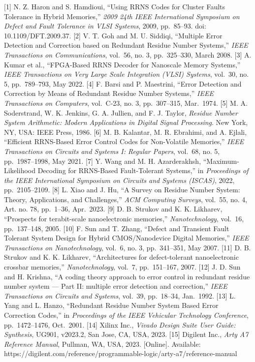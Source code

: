 {[}1{]} N. Z. Haron and S. Hamdioui, ``Using RRNS Codes for Cluster
Faults Tolerance in Hybrid Memories,'' \emph{2009 24th IEEE
International Symposium on Defect and Fault Tolerance in VLSI Systems},
2009, pp.~85--93. doi: 10.1109/DFT.2009.37. {[}2{]} V. T. Goh and M. U.
Siddiqi, ``Multiple Error Detection and Correction based on Redundant
Residue Number Systems,'' \emph{IEEE Transactions on Communications},
vol.~56, no. 3, pp.~325--330, March 2008. {[}3{]} A. Kumar et al.,
``FPGA-Based RRNS Decoder for Nanoscale Memory Systems,'' \emph{IEEE
Transactions on Very Large Scale Integration (VLSI) Systems}, vol.~30,
no. 5, pp.~789--793, May 2022. {[}4{]} F. Barsi and P. Maestrini,
``Error Detection and Correction by Means of Redundant Residue Number
Systems,'' \emph{IEEE Transactions on Computers}, vol.~C-23, no. 3,
pp.~307--315, Mar.~1974. {[}5{]} M. A. Soderstrand, W. K. Jenkins, G. A.
Jullien, and F. J. Taylor, \emph{Residue Number System Arithmetic:
Modern Applications in Digital Signal Processing}. New York, NY, USA:
IEEE Press, 1986. {[}6{]} M. B. Kalantar, M. R. Ebrahimi, and A. Ejlali,
``Efficient RRNS-Based Error Control Codes for Non-Volatile Memories,''
\emph{IEEE Transactions on Circuits and Systems I: Regular Papers},
vol.~68, no. 5, pp.~1987--1998, May 2021. {[}7{]} Y. Wang and M. H.
Azarderakhsh, ``Maximum-Likelihood Decoding for RRNS-Based
Fault-Tolerant Systems,'' in \emph{Proceedings of the IEEE International
Symposium on Circuits and Systems (ISCAS)}, 2022, pp.~2105--2109.
{[}8{]} L. Xiao and J. Hu, ``A Survey on Residue Number System: Theory,
Applications, and Challenges,'' \emph{ACM Computing Surveys}, vol.~55,
no. 4, Art. no. 78, pp.~1--36, Apr.~2023. {[}9{]} D. B. Strukov and K.
K. Likharev, ``Prospects for terabit-scale nanoelectronic memories,''
\emph{Nanotechnology}, vol.~16, pp.~137--148, 2005. {[}10{]} F. Sun and
T. Zhang, ``Defect and Transient Fault Tolerant System Design for Hybrid
CMOS/Nanodevice Digital Memories,'' \emph{IEEE Transactions on
Nanotechnology}, vol.~6, no. 3, pp.~341--351, May 2007. {[}11{]} D. B.
Strukov and K. K. Likharev, ``Architectures for defect-tolerant
nanoelectronic crossbar memories,'' \emph{Nanotechnology}, vol.~7,
pp.~151--167, 2007. {[}12{]} J. D. Sun and H. Krishna, ``A coding theory
approach to error control in redundant residue number system --- Part
II: multiple error detection and correction,'' \emph{IEEE Transactions
on Circuits and Systems}, vol.~39, pp.~18--34, Jan.~1992. {[}13{]} L.
Yang and L. Hanzo, ``Redundant Residue Number System Based Error
Correction Codes,'' in \emph{Proceedings of the IEEE Vehicular
Technology Conference}, pp.~1472--1476, Oct.~2001. {[}14{]} Xilinx Inc.,
\emph{Vivado Design Suite User Guide: Synthesis}, UG901, v2023.2, San
Jose, CA, USA, 2023. {[}15{]} Digilent Inc., \emph{Arty A7 Reference
Manual}, Pullman, WA, USA, 2023. {[}Online{]}. Available:
https://digilent.com/reference/programmable-logic/arty-a7/reference-manual

